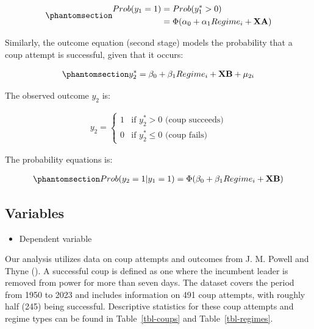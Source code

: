\documentclass[
  12pt,
]{report}
\providecommand{\tightlist}{%
  \setlength{\itemsep}{0pt}\setlength{\parskip}{0pt}}\usepackage{longtable,booktabs,array}
\begin{document}
\begin{equation}\phantomsection\label{eq-eq4a}{
\begin{aligned}
Prob(y_1 =1)&=Prob(y_{1}^*>0) \\
&=\Phi(\alpha_0 + \alpha_1 Regime_i + \mathbf{XA})
\end{aligned}
}\end{equation}

Similarly, the outcome equation (second stage) models the probability
that a coup attempt is successful, given that it occurs:

\begin{equation}\phantomsection\label{eq-eq5}{
\begin{aligned}
y_2^*=\beta_0 + \beta_1 Regime_i + \mathbf {XB} + \mu_{2i}
\end{aligned}
}\end{equation}

The observed outcome \(y_2\) is:

\[
\begin{aligned}
y_2 = 
\begin{cases} 
1 &\text{if $y_2^*>0$ (coup succeeds)} \\
0 &\text{if $y_2^*\le0$ (coup fails)}
\end{cases}
\end{aligned}
\]

The probability equations is:

\begin{equation}\phantomsection\label{eq-eq5a}{
\begin{aligned}
Prob(y_2=1|y_1 =1)=\Phi(\beta_0 + \beta_1 Regime_i + \mathbf{XB})
\end{aligned}
}\end{equation}

\subsection{Variables}\label{variables}

\begin{itemize}
\tightlist
\item
  Dependent variable
\end{itemize}

Our analysis utilizes data on coup attempts and outcomes from J. M.
Powell and Thyne (). A successful coup is
defined as one where the incumbent leader is removed from power for more
than seven days. The dataset covers the period from 1950 to 2023 and
includes information on 491 coup attempts, with roughly half (245) being
successful. Descriptive statistics for these coup attempts and regime
types can be found in Table~\ref{tbl-coups} and Table~\ref{tbl-regimes}.
\end{document}
